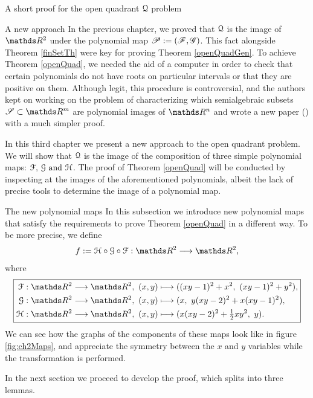 \documentclass[11pt, a4paper, english, twoside, notitlepage, openright]{report}
\begin{document}
\begin{chapter}{A short proof for the open quadrant $\mathcal{Q}$ problem}
\begin{section}{A new approach}
In the previous chapter, we proved that $\mathcal{Q}$ is the image of $\R^2$ under the polynomial map $\mathscr{P}:=(\mathscr{F},\mathscr{G})$. This fact alongside Theorem \ref{finSetTh} were key for proving Theorem \ref{openQuadGen}. To achieve Theorem \ref{openQuad}, we needed the aid of a computer in order to check that certain polynomials do not have roots on particular intervals or that they are positive on them. Although legit, this procedure is controversial, and the authors kept on working on the problem of characterizing which semialgebraic subsets $\mathscr{S} \subset \R^m$ are polynomial images of $\R^n$ and wrote a new paper (\cite{fu}) with a much simpler proof.

In this third chapter we present a new approach to the open quadrant problem. We will show that $\mathcal{Q}$ is the image of the composition of three simple polynomial maps: $\mathcal{F},\, \mathcal{G} \text{ and } \mathcal{H}$. The proof of Theorem \ref{openQuad} will be conducted by inspecting at the images of the aforementioned polynomials, albeit the lack of precise tools to determine the image of a polynomial map.

\begin{subsection}{The new polynomial maps}
In this subsection we introduce new polynomial maps that satisfy the requirements to prove Theorem \ref{openQuad} in a different way. To be more precise, we define 
$$
f:=\HH\circ\GG\circ\FF:\R^2\longrightarrow \R^2,
$$
where
\begin{equation*}\label{eq:secondMap}
\boxed{
\begin{aligned}
\FF:\R^2\longrightarrow \R^2,\ (x,y)&\longmapsto((xy-1)^2+x^2,\ (xy-1)^2+y^2), \\
\GG:\R^2\longrightarrow \R^2,\ (x,y)&\longmapsto(x,\ y(xy-2)^2+x(xy-1)^2), \\
\HH:\R^2\longrightarrow \R^2,\ (x,y)&\longmapsto(x(xy-2)^2+\tfrac{1}{2}xy^2,\ y). \\
\end{aligned}
}
\end{equation*}
We can see how the graphs of the components of these maps look like in figure \ref{fig:ch2Maps}, and appreciate the symmetry between the $x$ and $y$ variables while the transformation is performed.

\vspace{1mm}

In the next section we proceed to develop the proof, which splits into three lemmas.


\end{subsection}
\end{section}
\end{chapter}
\end{document}
